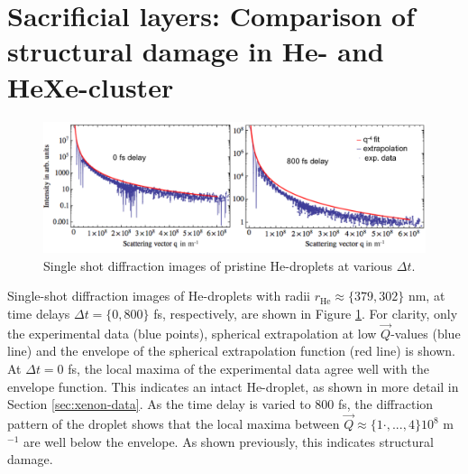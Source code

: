 \section{Sacrificial layers: Comparison of structural damage in He- and HeXe-cluster}\label{sec:comparison-of-He-and-HeXe-clusters}
\begin{figure}
	\centering
		\includegraphics[width=1.00\textwidth]{images/results/He-diffraction-patterns.pdf}
	\caption[Single-shot diffraction images of He-droplets at different time delays]{Single shot diffraction images of pristine He-droplets at various $\Delta t$.}
	\label{fig:He-diffraction-patterns}
\end{figure}
Single-shot diffraction images of He-droplets with radii $r_{\text{He}}\approx\{379, 302\}$ nm, at time delays $\Delta t=\{0, 800\}$ fs, respectively, are shown in Figure \ref{fig:He-diffraction-patterns}. For clarity, only the experimental data (blue points), spherical extrapolation at low $\vec{Q}$-values (blue line) and the envelope of the spherical extrapolation function (red line) is shown. At $\Delta t = 0$ fs, the local maxima of the experimental data agree well with the envelope function. This indicates an intact He-droplet, as shown in more detail in Section \ref{sec:xenon-data}. As the time delay is varied to $800$ fs, the diffraction pattern of the droplet shows that the local maxima between $\vec{Q} \approx \{1\cdot,...,4\}10^{8}$ m$^{-1}$ are well below the envelope. As shown previously, this indicates structural damage.\\
